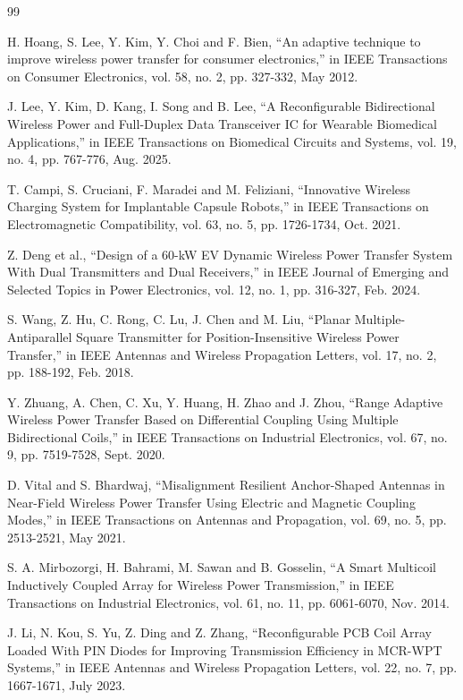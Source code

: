 \documentclass[journal]{IEEEtran}
\begin{document}
\newpage
\begin{thebibliography}{99}
\balance


 H. Hoang, S. Lee, Y. Kim, Y. Choi and F. Bien, ``An adaptive technique to improve wireless power transfer for consumer electronics,'' in IEEE Transactions on Consumer Electronics, vol. 58, no. 2, pp. 327-332, May 2012.

 J. Lee, Y. Kim, D. Kang, I. Song and B. Lee, ``A Reconfigurable Bidirectional Wireless Power and Full-Duplex Data Transceiver IC for Wearable Biomedical Applications,'' in IEEE Transactions on Biomedical Circuits and Systems, vol. 19, no. 4, pp. 767-776, Aug. 2025.

 T. Campi, S. Cruciani, F. Maradei and M. Feliziani, ``Innovative Wireless Charging System for Implantable Capsule Robots,'' in IEEE Transactions on Electromagnetic Compatibility, vol. 63, no. 5, pp. 1726-1734, Oct. 2021.

 Z. Deng et al., ``Design of a 60-kW EV Dynamic Wireless Power Transfer System With Dual Transmitters and Dual Receivers,'' in IEEE Journal of Emerging and Selected Topics in Power Electronics, vol. 12, no. 1, pp. 316-327, Feb. 2024.

 S. Wang, Z. Hu, C. Rong, C. Lu, J. Chen and M. Liu, ``Planar Multiple-Antiparallel Square Transmitter for Position-Insensitive Wireless Power Transfer,'' in IEEE Antennas and Wireless Propagation Letters, vol. 17, no. 2, pp. 188-192, Feb. 2018.

 Y. Zhuang, A. Chen, C. Xu, Y. Huang, H. Zhao and J. Zhou, ``Range Adaptive Wireless Power Transfer Based on Differential Coupling Using Multiple Bidirectional Coils,'' in IEEE Transactions on Industrial Electronics, vol. 67, no. 9, pp. 7519-7528, Sept. 2020.

 D. Vital and S. Bhardwaj, ``Misalignment Resilient Anchor-Shaped Antennas in Near-Field Wireless Power Transfer Using Electric and Magnetic Coupling Modes,'' in IEEE Transactions on Antennas and Propagation, vol. 69, no. 5, pp. 2513-2521, May 2021.

 S. A. Mirbozorgi, H. Bahrami, M. Sawan and B. Gosselin, ``A Smart Multicoil Inductively Coupled Array for Wireless Power Transmission,'' in IEEE Transactions on Industrial Electronics, vol. 61, no. 11, pp. 6061-6070, Nov. 2014.

 J. Li, N. Kou, S. Yu, Z. Ding and Z. Zhang, ``Reconfigurable PCB Coil Array Loaded With PIN Diodes for Improving Transmission Efficiency in MCR-WPT Systems,'' in IEEE Antennas and Wireless Propagation Letters, vol. 22, no. 7, pp. 1667-1671, July 2023.


\end{thebibliography}
\end{document}

